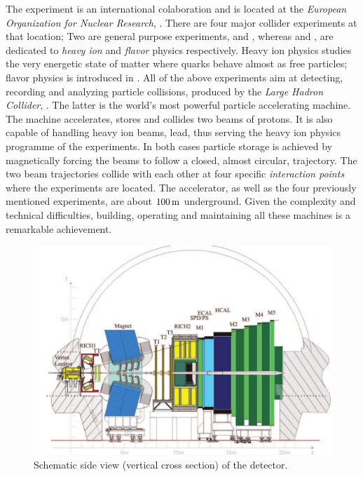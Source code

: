
The \lhcb experiment is an international colaboration and is located at the {\it European Organization for Nuclear Research}, \cern.
There are four major collider experiments at that location; Two are general purpose experiments, \atlas and \cms, whereas
\alice and \lhcb, are dedicated to {\it heavy ion} and {\it flavor} physics respectively. Heavy ion physics
studies the very energetic state of matter where quarks behave almost as free particles;
flavor physics is introduced in . All of the above experiments aim at detecting,
recording and analyzing particle collisions, produced by the {\it Large Hadron Collider}, \lhc.
The latter is the world's most powerful particle accelerating machine.
The \lhc machine accelerates, stores and collides two beams of protons. It is also capable of handling
heavy ion beams, \eg lead, thus serving the heavy ion physics programme of the experiments.
In both cases particle storage is achieved by magnetically forcing the beams to follow a closed, almost circular,
trajectory. The two beam trajectories collide with each other at four specific {\it interaction points}
where the experiments are located. The \lhc accelerator, as well as the four previously
mentioned experiments, are about $100\rm \,m$ underground. Given the complexity and technical difficulties,
building, operating and maintaining all these machines is a remarkable achievement.

\begin{figure}[t]
  \centering
  \includegraphics[width=1\textwidth]{Figures/Chapter2/detector_cross_cmyk}
  \caption{Schematic side view (vertical cross section) of the \lhcb detector.}
  \label{lhcb_detector_cross_section}
\end{figure}

